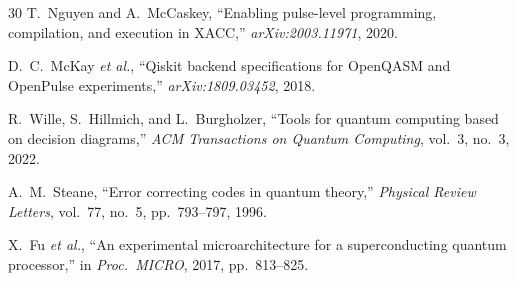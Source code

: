 \documentclass[journal]{IEEEtran}
\begin{document}
\begin{thebibliography}{30}
T.~Nguyen and A.~McCaskey, ``Enabling pulse-level programming, compilation, and execution in XACC,'' \emph{arXiv:2003.11971}, 2020.

D.~C.~McKay \emph{et al.}, ``Qiskit backend specifications for OpenQASM and OpenPulse experiments,'' \emph{arXiv:1809.03452}, 2018.

R.~Wille, S.~Hillmich, and L.~Burgholzer, ``Tools for quantum computing based on decision diagrams,'' \emph{ACM Transactions on Quantum Computing}, vol.~3, no.~3, 2022.

A.~M.~Steane, ``Error correcting codes in quantum theory,'' \emph{Physical Review Letters}, vol.~77, no.~5, pp.~793--797, 1996.

X.~Fu \emph{et al.}, ``An experimental microarchitecture for a superconducting quantum processor,'' in \emph{Proc.\ MICRO}, 2017, pp.~813--825.

\end{thebibliography}
\end{document}
